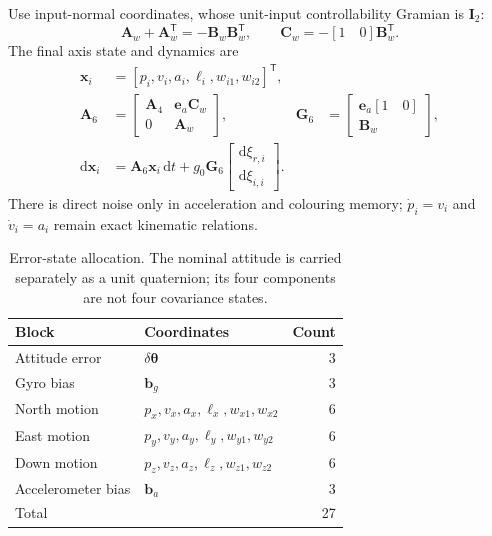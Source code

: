 \documentclass[conference]{IEEEtran}
\newcommand{\vc}[1]{\bm{#1}}
\newcommand{\mt}[1]{\bm{#1}}
\newcommand{\tr}{^{\mathsf T}}
\newcommand{\dd}{\mathrm d}
\begin{document}
Use input-normal coordinates, whose unit-input controllability Gramian is
$\mt I_2$:
\begin{equation}
 \mt A_w+\mt A_w\tr=-\mt B_w\mt B_w\tr,\qquad
 \mt C_w=-[1\quad0]\mt B_w\tr.
 \label{eq:inputnormal}
\end{equation}
The final axis state and dynamics are
\begin{align}
 \vc x_i&=[p_i,v_i,a_i,\ell_i,w_{i1},w_{i2}]\tr,\nonumber\\
 \mt A_6&=\begin{bmatrix}\mt A_4&\vc e_a\mt C_w\\0&\mt A_w\end{bmatrix},&
 \mt G_6&=\begin{bmatrix}\vc e_a[1\quad0]\\\mt B_w\end{bmatrix},\label{eq:A6}\\
 \dd\vc x_i&=\mt A_6\vc x_i\,\dd t+
                 g_0\mt G_6\begin{bmatrix}\dd\xi_{r,i}\\\dd\xi_{i,i}\end{bmatrix}.
 \nonumber
\end{align}
There is direct noise only in acceleration and colouring memory;
$\dot p_i=v_i$ and $\dot v_i=a_i$ remain exact kinematic relations.

\begin{table}[!t]
\caption{Error-state allocation. The nominal attitude is carried separately
as a unit quaternion; its four components are not four covariance states.}
\label{tab:states}\centering
\begin{tabular}{@{}llr@{}}\toprule
Block & Coordinates & Count\\\midrule
Attitude error & $\delta\vc\theta$ & 3\\
Gyro bias & $\vc b_g$ & 3\\
North motion & $p_x,v_x,a_x,\ell_x,w_{x1},w_{x2}$ & 6\\
East motion & $p_y,v_y,a_y,\ell_y,w_{y1},w_{y2}$ & 6\\
Down motion & $p_z,v_z,a_z,\ell_z,w_{z1},w_{z2}$ & 6\\
Accelerometer bias & $\vc b_a$ & 3\\\midrule
Total & & 27\\\bottomrule
\end{tabular}
\end{table}
\end{document}
